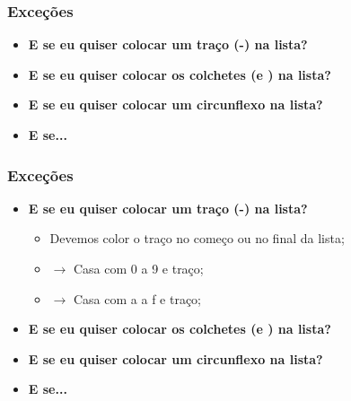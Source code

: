 \begin{frame}
	\frametitle{Exceções}
	
	\begin{itemize}
		\item \textbf{E se eu quiser colocar um traço (-) na lista?}
		\item \textbf{E se eu quiser colocar os colchetes (\lcol  e \rcol) na lista?}
		\item \textbf{E se eu quiser colocar um circunflexo na lista?}
		\item \textbf{E se...}
	\end{itemize}

\end{frame}

\begin{frame}
	\frametitle{Exceções}
	
	\begin{itemize}
		\item \textbf{E se eu quiser colocar um traço (-) na lista?}
		\begin{itemize}
			\item Devemos color o traço no começo ou no final da lista;
			\item {} $\rightarrow$ Casa com 0 a 9 e traço;
			\item {} $\rightarrow$ Casa com a a f e traço;
		\end{itemize}
		\item \textbf{E se eu quiser colocar os colchetes (\lcol  e \rcol) na lista?}
		\item \textbf{E se eu quiser colocar um circunflexo na lista?}
		\item \textbf{E se...}
	\end{itemize}

\end{frame}

